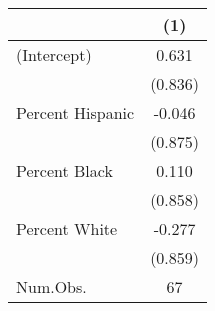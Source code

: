 \begin{longtable}{lc}
\toprule
  & (1) \\ 
\midrule\addlinespace[2.5pt]
(Intercept) & 0.631 \\ 
 & (0.836) \\ 
Percent Hispanic & -0.046 \\ 
 & (0.875) \\ 
Percent Black & 0.110 \\ 
 & (0.858) \\ 
Percent White & -0.277 \\ 
 & (0.859) \\ 
Num.Obs. & 67 \\ 
\bottomrule
\end{longtable}

